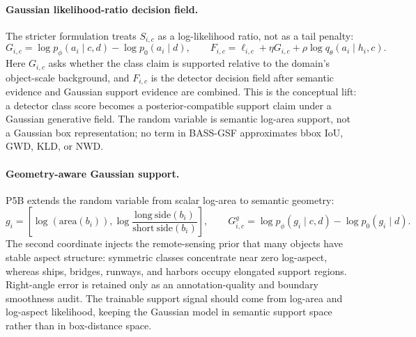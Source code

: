 \documentclass[10pt]{article}
\begin{document}
\paragraph{Gaussian likelihood-ratio decision field.}
The stricter formulation treats $S_{i,c}$ as a log-likelihood ratio, not as a
tail penalty:
\begin{equation}
  G_{i,c} =
  \log p_\phi(a_i\mid c,d) - \log p_0(a_i\mid d), \qquad
  F_{i,c} = \ell_{i,c} + \eta G_{i,c}
  + \rho \log q_\theta(a_i\mid h_i,c).
\end{equation}
Here $G_{i,c}$ asks whether the class claim is supported relative to the
domain's object-scale background, and $F_{i,c}$ is the detector decision field
after semantic evidence and Gaussian support evidence are combined.  This is
the conceptual lift: a detector class score becomes a posterior-compatible
support claim under a Gaussian generative field.  The random variable is
semantic log-area support, not a Gaussian box representation; no term in
BASS-GSF approximates bbox IoU, GWD, KLD, or NWD.

\paragraph{Geometry-aware Gaussian support.}
P5B extends the random variable from scalar log-area to semantic geometry:
\begin{equation}
  g_i=\left[\log(\mathrm{area}(b_i)),
  \log\frac{\mathrm{long\ side}(b_i)}{\mathrm{short\ side}(b_i)}\right],
  \qquad
  G_{i,c}^{g}=\log p_\phi(g_i\mid c,d)-\log p_0(g_i\mid d).
\end{equation}
The second coordinate injects the remote-sensing prior that many objects have
stable aspect structure: symmetric classes concentrate near zero log-aspect,
whereas ships, bridges, runways, and harbors occupy elongated support regions.
Right-angle error is retained only as an annotation-quality and boundary
smoothness audit.  The trainable support signal should come from log-area and
log-aspect likelihood, keeping the Gaussian model in semantic support space
rather than in box-distance space.
\end{document}
